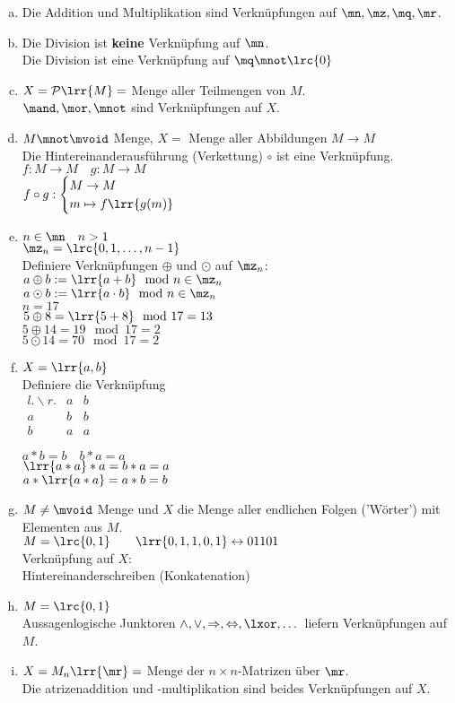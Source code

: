 	\begin{enumerate}[a)]
		\item Die Addition und Multiplikation sind Verknüpfungen auf $\mn,\mz,\mq,\mr$.
		\item Die Division ist \textbf{keine} Verknüpfung auf $\mn$. \\
			Die Division ist eine Verknüpfung auf $\mq\mnot\lrc{0}$
		\item $X=\mathcal{P}\lrr{M}=$ Menge aller Teilmengen von $M$.\\
			$\mand,\mor,\mnot$ sind Verknüpfungen auf $X$.
		\item $M\mnot\mvoid$ Menge, $X=$ Menge aller Abbildungen $M\rightarrow M$ \\
			Die Hintereinanderausführung (Verkettung) $\circ$ ist eine Verknüpfung. \\
			$f:M\rightarrow M \quad g:M\rightarrow M$\\
			$f\circ g:\begin{cases}M\rightarrow M\\m\mapsto f\lrr{g(m)}\end{cases}$
		\item $n\in\mn\quad n>1$\\
			$\mz_n=\lrc{0,1,\dots,n-1}$\\
			Definiere Verknüpfungen $\oplus$ und $\odot$ auf $\mz_n$:\\
			$a\oplus b:=\lrr{a+b}\mod n\in\mz_n$\\
			$a\odot b:=\lrr{a\cdot b}\mod n\in\mz_n$\\
			$n=17$\\
			$5\oplus 8=\lrr{5+8}\mod 17=13$\\
			$5\oplus 14=19\mod 17=2$\\
			$5\odot 14=70\mod 17=2$
\newpage
		\item $X=\lrr{a,b}$\\
			Definiere die Verknüpfung\\
			$\begin{array}{c|cc}
				l.\backslash r.&a&b\\\hline
				a&b&b\\
				b&a&a
			\end{array}$

			$a*b=b\quad b*a=a$\\
			$\lrr{a*a}*a=b*a=a$\\
			$a*\lrr{a*a}=a*b=b$
		\item $M\neq\mvoid$ Menge und $X$ die Menge aller endlichen Folgen ('Wörter') mit Elementen aus $M$.\\
			$M=\lrc{0,1}\qquad\lrr{0,1,1,0,1}\leftrightarrow 01101$\\
			Verknüpfung auf $X$:\\
			Hintereinanderschreiben (Konkatenation)
		\item $M=\lrc{0,1}$\\
			Aussagenlogische Junktoren $\land,\lor,\Rightarrow,\Leftrightarrow,\lxor,\dots$ liefern Verknüpfungen auf $M$.
		\item $X=M_n\lrr{\mr}=$ Menge der $n\times n$-Matrizen über $\mr$.\\
			Die atrizenaddition und -multiplikation sind beides Verknüpfungen auf $X$.
	\end{enumerate}
